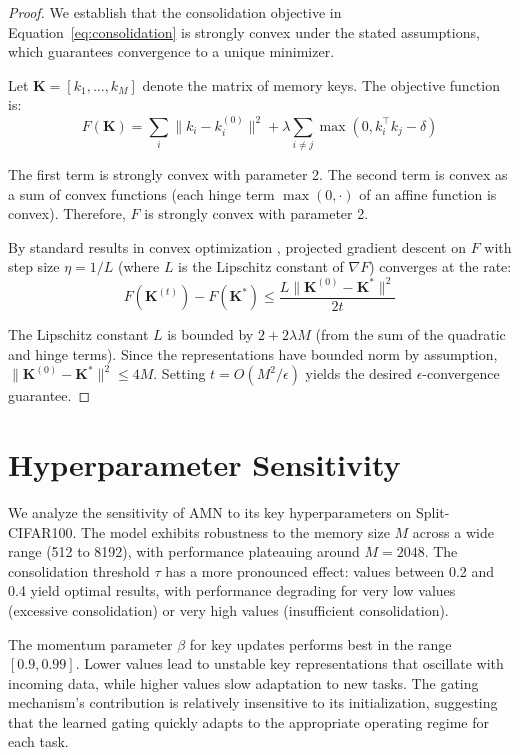 \documentclass[11pt]{article}
\begin{document}
\begin{proof}
We establish that the consolidation objective in Equation~\ref{eq:consolidation} is strongly convex under the stated assumptions, which guarantees convergence to a unique minimizer.

Let $\mathbf{K} = [k_1, \ldots, k_M]$ denote the matrix of memory keys. The objective function is:
\begin{equation}
    F(\mathbf{K}) = \sum_{i} \|k_i - k_i^{(0)}\|^2 + \lambda \sum_{i \neq j} \max(0, k_i^\top k_j - \delta)
\end{equation}

The first term is strongly convex with parameter 2. The second term is convex as a sum of convex functions (each hinge term $\max(0, \cdot)$ of an affine function is convex). Therefore, $F$ is strongly convex with parameter 2.

By standard results in convex optimization \citep{boyd2004convex}, projected gradient descent on $F$ with step size $\eta = 1/L$ (where $L$ is the Lipschitz constant of $\nabla F$) converges at the rate:
\begin{equation}
    F(\mathbf{K}^{(t)}) - F(\mathbf{K}^*) \leq \frac{L \|\mathbf{K}^{(0)} - \mathbf{K}^*\|^2}{2t}
\end{equation}

The Lipschitz constant $L$ is bounded by $2 + 2\lambda M$ (from the sum of the quadratic and hinge terms). Since the representations have bounded norm by assumption, $\|\mathbf{K}^{(0)} - \mathbf{K}^*\|^2 \leq 4M$. Setting $t = O(M^2/\epsilon)$ yields the desired $\epsilon$-convergence guarantee.
\end{proof}

\section{Hyperparameter Sensitivity}
\label{app:hyperparams}

We analyze the sensitivity of AMN to its key hyperparameters on Split-CIFAR100. The model exhibits robustness to the memory size $M$ across a wide range (512 to 8192), with performance plateauing around $M = 2048$. The consolidation threshold $\tau$ has a more pronounced effect: values between 0.2 and 0.4 yield optimal results, with performance degrading for very low values (excessive consolidation) or very high values (insufficient consolidation).

The momentum parameter $\beta$ for key updates performs best in the range $[0.9, 0.99]$. Lower values lead to unstable key representations that oscillate with incoming data, while higher values slow adaptation to new tasks. The gating mechanism's contribution is relatively insensitive to its initialization, suggesting that the learned gating quickly adapts to the appropriate operating regime for each task.
\end{document}
